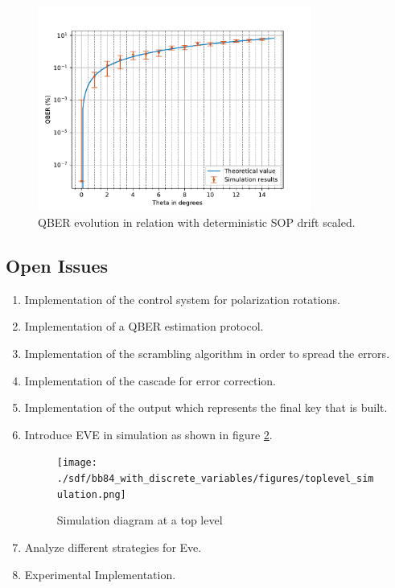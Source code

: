 \begin{refsection}
\begin{figure}[H]
    \centering
        \includegraphics[clip, trim=0.2cm 0.0cm 0.5cm 1cm, width=0.80\textwidth]{./sdf/bb84_with_discrete_variables/figures/QBER_vs_theta_upto15.pdf}
    \caption{QBER evolution in relation with deterministic SOP drift scaled.}\label{qber_log_scaled}
\end{figure}
\newpage

\subsection{Open Issues}
\begin{enumerate}

    \item Implementation of the control system for polarization rotations.
    \item Implementation of a QBER estimation protocol.
    \item Implementation of the scrambling algorithm in order to spread the errors.
    \item Implementation of the cascade for error correction.
    \item Implementation of the output which represents the final key that is built.
    \item Introduce EVE in simulation as shown in figure \ref{toplevelsimulation2}.
        \begin{figure}[H]
        	\centering
        	\texttt{[image: ./sdf/bb84\_with\_discrete\_variables/figures/toplevel\_simulation.png]}
        	\caption{Simulation diagram at a top level}\label{toplevelsimulation2}
        \end{figure}
    \item Analyze different strategies for Eve.  
    \item Experimental Implementation.
\end{enumerate}




\end{refsection}
